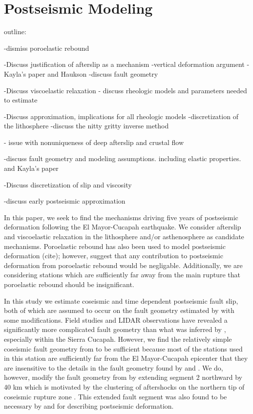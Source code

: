 \documentclass[12pt]{article}
\begin{document}
\section*{Postseismic Modeling}

outline:

-dismiss poroelastic rebound

-Discuss justification of afterslip as a mechanism
 -vertical deformation argument
 -Kayla's paper and Haukson
 -discuss fault geometry
 
-Discuss viscoelastic relaxation
  - discuss rheologic models and parameters needed to estimate

-Discuss approximation, implications for all rheologic models
-discretization of the lithosphere
-discuss the nitty gritty inverse method

- issue with nonuniqueness of deep afterslip and crustal flow

-discuss fault geometry and modeling assumptions. including elastic properties. and Kayla's paper

-Discuss discretization of slip and viscosity

-discuss early postseismic approximation

In this paper, we seek to find the mechanisms driving five years of postseismic deformation following the El Mayor-Cucapah earthquake. We consider afterslip and viscoelastic relaxation in the lithosphere and/or asthenosphere as candidate mechanisms.  Poroelastic rebound has also been used to model postseismic deformation (cite); however, \cite{Gonzalez-ortega2014} suggest that any contribution to postseismic deformation from poroelastic rebound would be negligable.  Additionally, we are considering stations which are sufficiently far away from the main rupture that poroelastic rebound should be insignificant.  

In this study we estimate coseismic and time dependent postseismic fault slip, both of which are assumed to occur on the fault geometry estimated by \cite{Wei2011a} with some modifications.  Field studies \cite{Fletcher2014} and LIDAR observations \cite{Oskin2012} have revealed a significantly more complicated fault geometry than what was inferred by \cite{Wei2011a}, especially within the Sierra Cucapah.  However, we find the relatively simple coseismic fault geometry from \cite{Wei2011a} to be sufficient because most of the stations used in this station are sufficiently far from the El Mayor-Cucapah epicenter that they are insensitive to the details in the fault geometry found by \cite{Fletcher2014} and \cite{Oskin2012}.  We do, however, modify the fault geometry from \cite{Wei2011a} by extending segment 2 northward by 40 km which is motivated by the clustering of aftershocks on the northern tip of coseismic rupture zone \cite{Kroll2013} \cite{Hauksson2011}.  This extended fault segment was also found to be necessary by \cite{Rollins2015} and \cite{Pollitz2012} for describing postseismic deformation.     
\end{document}
